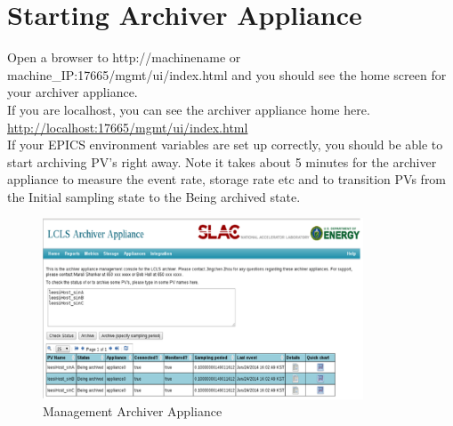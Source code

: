 \documentclass[11pt
  , a4paper
  , article
  , oneside
]{memoir}
\begin{document}
\section{Starting Archiver Appliance}
Open a browser to http://machinename or machine\_IP:17665/mgmt/ui/index.html and you should see the home screen for your archiver appliance.\\
If you are localhost, you can see the archiver appliance home here.\\ \url{http://localhost:17665/mgmt/ui/index.html}\\
If your EPICS environment variables are set up correctly, you should be able to start archiving PV's right away. Note it takes about 5 minutes for the archiver appliance to measure the event rate, storage rate etc and to transition PVs from the Initial sampling state to the Being archived state.\\
	\begin{figure}[h!]
		\centering
		\includegraphics[width=0.85\textwidth, height=0.5\textwidth]{./images/image-5.eps}
		\caption{Management Archiver Appliance} 
	\end{figure}
\end{document}
